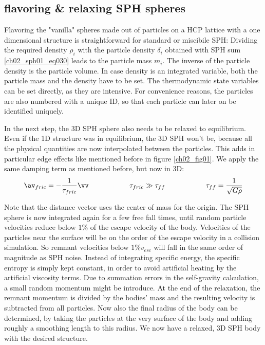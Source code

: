 \subsection{flavoring \& relaxing SPH spheres}
Flavoring the "vanilla" spheres made out of particles on a HCP lattice with a one dimensional structure is straightforward for standard or miscibile SPH: Dividing the required density $\rho_i$ with the particle density $\delta_i$ obtained with SPH sum \ref{ch02_sph01_eq030} leads to the particle mass $m_i$. The inverse of the particle density is the particle volume. In case density is an integrated variable, both the particle mass and the density have to be set. The thermodynamic state variables can be set directly, as they are intensive. For convenience reasons, the particles are also numbered with a unique ID, so that each particle can later on be identified uniquely.

In the next step, the 3D SPH sphere also needs to be relaxed to equilibrium. Even if the 1D structure was in equilibrium, the 3D SPH won't be, because all the physical quantities are now interpolated between the particles. This adds in particular edge effects like mentioned before in figure \ref{ch02_fig01}. We apply the same damping term as mentioned before, but now in 3D:
\begin{equation}
\label{ch02_aux_eq002}
\av_{fric} = - \frac{1}{\tau_{fric}} \vv \hspace{2.0cm} \tau_{fric} \gg \tau_{ff}\hspace{2.0cm} \tau_{ff} = \frac{1}{\sqrt{G \rho} }
\end{equation}

Note that the distance vector uses the center of mass for the origin. The SPH sphere is now integrated again for a few free fall times, until random particle velocities reduce below $1\%$ of the escape velocity of the body. Velocities of the particles near the surface will be on the order of the escape velocity in a collision simulation. So remnant velocities below $1\% v_{esc}$ will fall in the same order of magnitude as SPH noise. Instead of integrating specific energy, the specific entropy is simply kept constant, in order to avoid artificial heating by the artificial viscosity terms. Due to summation errors in the self-gravity calculation, a small random momentum might be introduce. At the end of the relaxation, the remnant momentum is divided by the bodies' mass and the resulting velocity is subtracted from all particles. Now also the final radius of the body can be determined, by taking the particles at the very surface of the body and adding roughly a smoothing length to this radius. We now have a relaxed, 3D SPH body with the desired structure.

